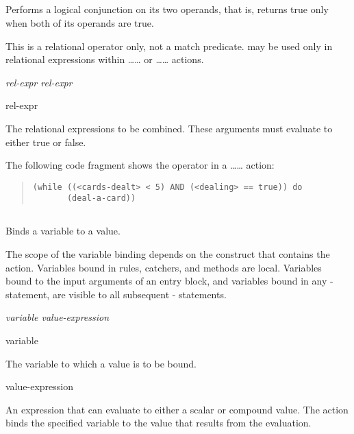 \subsection{}

Performs a logical conjunction on its two operands, that is, returns
true only when both of its operands are true.

\begin{note}
  This is a relational operator only, not a match predicate. 
  may be used only in relational expressions within
  \ldots{}\ldots{} or
  \ldots{}\ldots{} actions.
\end{note}

\Format

\it{rel-expr}  \it{rel-expr}

\begin{operands}
\item[rel-expr]

  The relational expressions to be combined. These arguments must
  evaluate to either true or false.
\end{operands}

\Example

The following code fragment shows the  operator in a
\ldots{}\ldots{} action:

\begin{quote}
\begin{verbatim}
(while ((<cards-dealt> < 5) AND (<dealing> == true)) do
       (deal-a-card))
\end{verbatim}
\end{quote}

\subsection{}

Binds a variable to a value.

The scope of the variable binding depends on the construct that
contains the  action. Variables bound in rules, catchers, and
methods are local. Variables bound to the input arguments of an entry
block, and variables bound in any - statement, are visible to
all subsequent - statements.

\Format

 \it{variable} \it{value-expression}

\begin{arguments}
\item[variable]

  The variable to which a value is to be bound.

\item[value-expression]

  An expression that can evaluate to either a scalar or compound
  value. The action binds the specified variable to the value that
  results from the evaluation.
\end{arguments}

